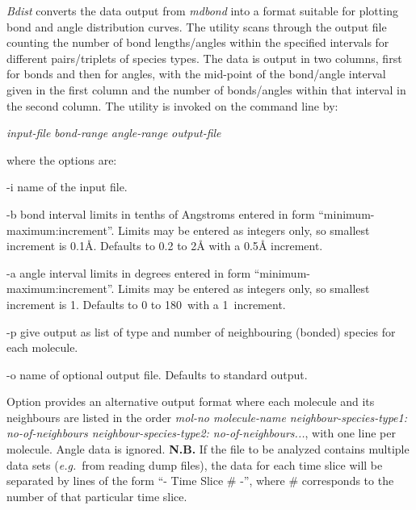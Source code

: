 \documentclass[a4paper,twoside]{report}
\newcommand{\eg}{\emph{e.g.}}
\begin{document}
\emph{Bdist} converts the data output from \emph{mdbond} into a format
suitable for
plotting bond and angle distribution curves. The utility scans through the
output file counting the number of bond lengths/angles within the
specified intervals for different pairs/triplets of species types. The
data is output in two columns, first for bonds and then for angles, with
the mid-point of the bond/angle interval given in the first column and the
number of bonds/angles within that interval in the second column. The
utility is invoked on the command line by:

\begin{center}
\Lit{[-i} \textit{input-file}\Lit{]}
\Lit{[-b} \textit{bond-range}\Lit{]}
\Lit{[-a} \textit{angle-range}\Lit{]}
\Lit{[-p]}
\Lit{[-o} \textit{output-file}\Lit{]}
\end{center}

where the options are:
\begin{Argdescription}
\item[-i] name of the input file.
\item[-b] bond interval limits in tenths of Angstroms entered in form
  ``minimum-maximum:increment''. Limits may be entered as integers
  only, so smallest increment is 0.1{\AA}. Defaults to 0.2 to 2{\AA} with
  a 0.5{\AA} increment.
\item[-a] angle interval limits in degrees entered in form
  ``minimum-maximum:increment''. Limits may be entered as integers only,
  so smallest increment is 1{\textdegree}. Defaults to 0 to
  180{\textdegree}\ with a 1{\textdegree}\ increment.
\item[-p] give output as list of type and number
of neighbouring (bonded) species for each molecule.
\item[-o] name of optional output file. Defaults to standard output.
\end{Argdescription}

Option  provides an alternative output format where each molecule and its neighbours
are listed in the order \textit{mol-no molecule-name neighbour-species-type1: no-of-neighbours
 neighbour-species-type2: no-of-neighbours...}, with one line per molecule. Angle data is ignored.
\textbf{N.B.} If the file to be analyzed contains
multiple data sets (\eg\ from reading dump files), the data for each time slice
will be separated by lines of the form ``- Time Slice \# -'', where \# corresponds to the
number of that particular time slice.

\end{document}
